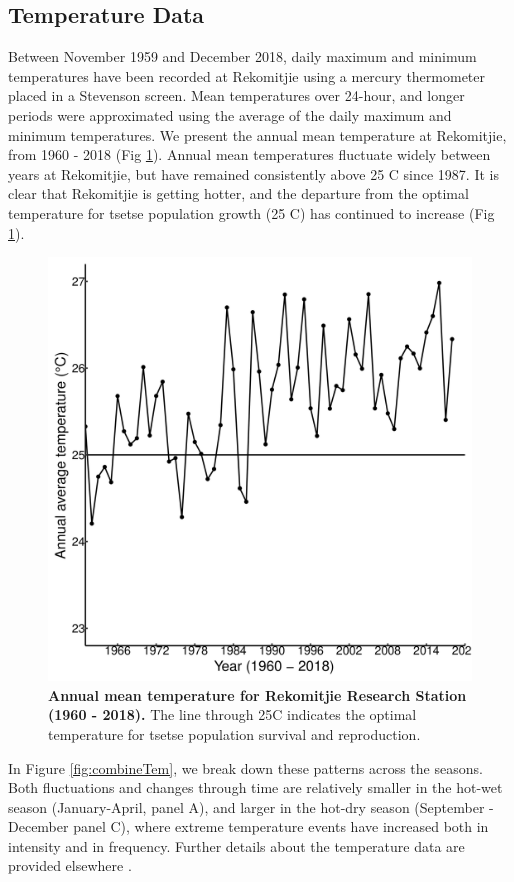 \documentclass[12pt,a4paper]{article}
\begin{document}
\subsection*{Temperature Data}
Between November 1959 and December 2018, daily maximum and minimum temperatures have been recorded at Rekomitjie using a mercury thermometer placed in a Stevenson screen.  Mean temperatures over 24-hour, and longer periods were approximated using the average of the daily maximum and minimum temperatures. We present the annual mean temperature at Rekomitjie, from 1960 - 2018 (Fig \ref{fig:AnnualAveTem}). Annual mean temperatures fluctuate widely between years at Rekomitjie, but have remained consistently above 25 \degree C since 1987. It is clear that Rekomitjie is getting hotter, and the departure from the optimal temperature for tsetse population growth (25 \degree C) \cite{Are2019} has continued to increase (Fig \ref{fig:AnnualAveTem}).  



\begin{figure}[hbt!]
	\centering
	\includegraphics[width=0.7\linewidth]{20April20AnnualAverageTemp1960to2018}
	\caption{{\bf Annual mean temperature for Rekomitjie Research Station (1960 - 2018).} The line through 25\degree C indicates the optimal temperature for tsetse population survival and reproduction.}
	\label{fig:AnnualAveTem}
\end{figure}


\newpage
In Figure \ref{fig:combineTem}, we break down these patterns across the seasons. Both fluctuations and changes through time are relatively smaller in the hot-wet season (January-April, panel A), and larger in the hot-dry season (September - December panel C), where extreme temperature events have increased both in intensity and in frequency. Further details about the temperature data are provided elsewhere \cite{Lord2018}.     
\end{document}
